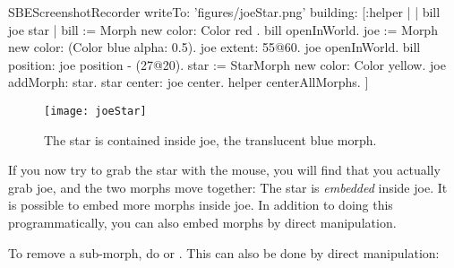 \documentclass[a4paper,10pt,twoside]{book}
\begin{document}
\begin{ExecuteSmalltalkScript}
SBEScreenshotRecorder writeTo: 'figures/joeStar.png' building: [:helper |
	| bill joe star |
	bill := Morph new color: Color red .
	bill openInWorld.
	joe := Morph new color: (Color blue alpha: 0.5).
	joe extent: 55@60.
	joe openInWorld.
	bill position: joe position - (27@20).
	star := StarMorph new color: Color yellow.
	joe addMorph: star.
	star center: joe center.
	helper centerAllMorphs.
]
\end{ExecuteSmalltalkScript}
\begin{figure}[ht]
	\centerline{\texttt{[image: joeStar]}}
	\caption{The star is contained inside joe, the translucent blue morph.
		\label{fig:joeStar}}
\end{figure}

If you now try to grab the star with the mouse, you will find that you actually grab joe, and the two morphs move together:
The star is \emph{embedded} inside joe.
It is possible to embed more morphs inside joe.  
In addition to doing this programmatically, you can also embed morphs by direct manipulation.



To remove a sub-morph, do    or  .
This can also be done by direct manipulation:

\end{document}
